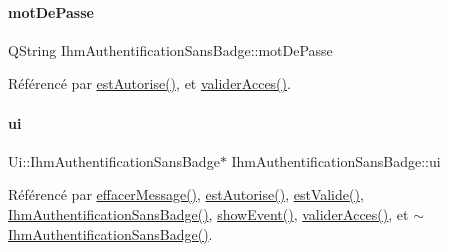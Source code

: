 \paragraph{\texorpdfstring{mot\+De\+Passe}{motDePasse}}
{\footnotesize\ttfamily Q\+String Ihm\+Authentification\+Sans\+Badge\+::mot\+De\+Passe\hspace{0.3cm}{\ttfamily [private]}}



Référencé par \hyperlink{class_ihm_authentification_sans_badge_a17b178accdfe141a7e27fa1888bebcbc}{est\+Autorise()}, et \hyperlink{class_ihm_authentification_sans_badge_a1d6f062da30edd3ba8fe74906e8f16cf}{valider\+Acces()}.

\mbox{\label{class_ihm_authentification_sans_badge_a95e8a9d049b6e5f262b45e3362d2bbee}} 
\paragraph{\texorpdfstring{ui}{ui}}
{\footnotesize\ttfamily Ui\+::\+Ihm\+Authentification\+Sans\+Badge$\ast$ Ihm\+Authentification\+Sans\+Badge\+::ui\hspace{0.3cm}{\ttfamily [private]}}



Référencé par \hyperlink{class_ihm_authentification_sans_badge_a6dfdc8197ea602634455e80b35af7c87}{effacer\+Message()}, \hyperlink{class_ihm_authentification_sans_badge_a17b178accdfe141a7e27fa1888bebcbc}{est\+Autorise()}, \hyperlink{class_ihm_authentification_sans_badge_a676cfdbf93ef79fb7c4c47fdd8d0fb43}{est\+Valide()}, \hyperlink{class_ihm_authentification_sans_badge_aace6d9eebcab9fee429fe9dbb6840f15}{Ihm\+Authentification\+Sans\+Badge()}, \hyperlink{class_ihm_authentification_sans_badge_ad60d540d145d0bb940ccbb0850de2c35}{show\+Event()}, \hyperlink{class_ihm_authentification_sans_badge_a1d6f062da30edd3ba8fe74906e8f16cf}{valider\+Acces()}, et \hyperlink{class_ihm_authentification_sans_badge_a39197686724a0ad151c0c998301c198e}{$\sim$\+Ihm\+Authentification\+Sans\+Badge()}.

\mbox{\label{class_ihm_authentification_sans_badge_a653eb9abd54ba736b3d98b994a7e4f1f}} 
